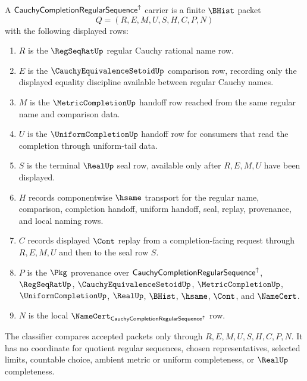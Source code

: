 \begin{definition}
\label{def:cauchy-completion-regular-sequence-carrier}
A $\mathsf{CauchyCompletionRegularSequence}^{\uparrow}$ carrier is a finite $\BHist$ packet
$$
Q=(R,E,M,U,S,H,C,P,N)
$$
with the following displayed rows:
\begin{enumerate}
\item $R$ is the $\RegSeqRatUp$ regular Cauchy rational name row.
\item $E$ is the $\CauchyEquivalenceSetoidUp$ comparison row, recording only the displayed equality discipline available between regular Cauchy names.
\item $M$ is the $\MetricCompletionUp$ handoff row reached from the same regular name and comparison data.
\item $U$ is the $\UniformCompletionUp$ handoff row for consumers that read the completion through uniform-tail data.
\item $S$ is the terminal $\RealUp$ seal row, available only after $R,E,M,U$ have been displayed.
\item $H$ records componentwise $\hsame$ transport for the regular name, comparison, completion handoff, uniform handoff, seal, replay, provenance, and local naming rows.
\item $C$ records displayed $\Cont$ replay from a completion-facing request through $R,E,M,U$ and then to the seal row $S$.
\item $P$ is the $\Pkg$ provenance over $\mathsf{CauchyCompletionRegularSequence}^{\uparrow}$, $\RegSeqRatUp$, $\CauchyEquivalenceSetoidUp$, $\MetricCompletionUp$, $\UniformCompletionUp$, $\RealUp$, $\BHist$, $\hsame$, $\Cont$, and $\NameCert$.
\item $N$ is the local $\NameCert_{\CauchyCompletionRegularSequenceUp}$ row.
\end{enumerate}
The classifier compares accepted packets only through $R,E,M,U,S,H,C,P,N$. It has no coordinate for quotient regular sequences, chosen representatives, selected limits, countable choice, ambient metric or uniform completeness, or $\RealUp$ completeness.
\end{definition}

